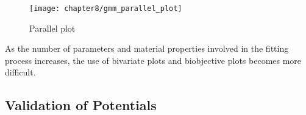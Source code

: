 \begin{figure}[hbt]
	\centering
	\captionsetup{justification=centering,margin=1in}
	\texttt{[image: chapter8/gmm\_parallel\_plot]}
	\caption{Parallel plot}
	\label{fig:Si_gmm_parallel_plot_2_qoi}
\end{figure}


As the number of parameters and material properties involved in the fitting process increases, the use of bivariate plots and biobjective plots becomes more difficult.


\subsection{Validation of Potentials}
